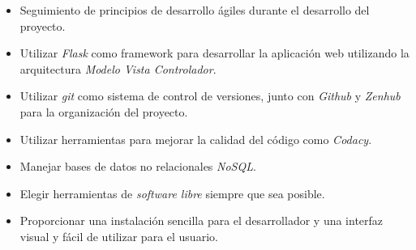 \begin{itemize}
	\item Seguimiento de principios de desarrollo ágiles durante el desarrollo del proyecto.
	\item Utilizar \textit{Flask} como framework para desarrollar la aplicación web utilizando la arquitectura \textit{Modelo Vista Controlador}.
	\item Utilizar \textit{git} como sistema de control de versiones, junto con \textit{Github} y \textit{Zenhub} para la organización del proyecto.
	\item Utilizar herramientas para mejorar la calidad del código como \textit{Codacy}.
	\item Manejar bases de datos no relacionales \textit{NoSQL}.
	\item Elegir herramientas de \textit{software libre} siempre que sea posible.
	\item Proporcionar una instalación sencilla para el desarrollador y una interfaz visual y fácil de utilizar para el usuario.
\end{itemize}


